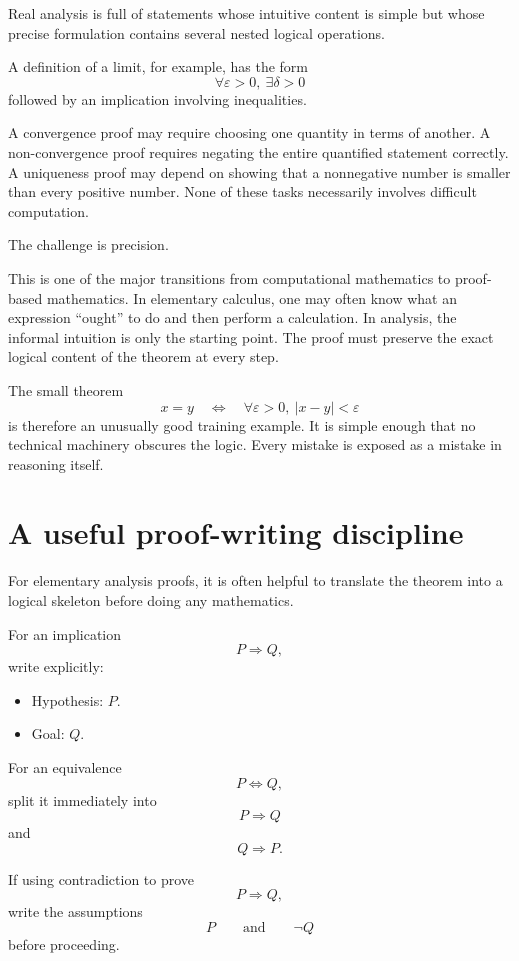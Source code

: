 \documentclass{essay}
\begin{document}
Real analysis is full of statements whose intuitive content is simple but whose precise formulation contains several nested logical operations.

A definition of a limit, for example, has the form
\[
\forall \varepsilon>0,\ \exists \delta>0
\]
followed by an implication involving inequalities.

A convergence proof may require choosing one quantity in terms of another. A non-convergence proof requires negating the entire quantified statement correctly. A uniqueness proof may depend on showing that a nonnegative number is smaller than every positive number. None of these tasks necessarily involves difficult computation.

The challenge is precision.

This is one of the major transitions from computational mathematics to proof-based mathematics. In elementary calculus, one may often know what an expression ``ought'' to do and then perform a calculation. In analysis, the informal intuition is only the starting point. The proof must preserve the exact logical content of the theorem at every step.

The small theorem
\[
x=y
\quad\Longleftrightarrow\quad
\forall \varepsilon>0,\ |x-y|<\varepsilon
\]
is therefore an unusually good training example. It is simple enough that no technical machinery obscures the logic. Every mistake is exposed as a mistake in reasoning itself.

\section{A useful proof-writing discipline}

For elementary analysis proofs, it is often helpful to translate the theorem into a logical skeleton before doing any mathematics.

For an implication
\[
P\Longrightarrow Q,
\]
write explicitly:

\begin{itemize}
    \item Hypothesis: \(P\).
    \item Goal: \(Q\).
\end{itemize}

For an equivalence
\[
P\Longleftrightarrow Q,
\]
split it immediately into
\[
P\Longrightarrow Q
\]
and
\[
Q\Longrightarrow P.
\]

If using contradiction to prove
\[
P\Longrightarrow Q,
\]
write the assumptions
\[
P
\qquad\text{and}\qquad
\neg Q
\]
before proceeding.
\end{document}
